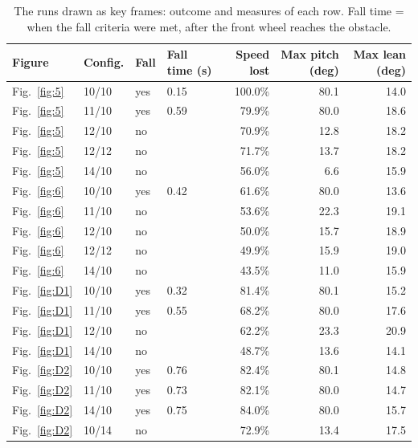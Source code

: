 \begin{table}[htbp]
\centering\small
\caption{The runs drawn as key frames: outcome and measures of each row. Fall time = when the fall criteria were met, after the front wheel reaches the obstacle.}\label{tab:Ekey}
\begin{tabular}{@{}llllrrr@{}}
\toprule
Figure & Config. & Fall & Fall time (s) & Speed lost & Max pitch (deg) & Max lean (deg) \\
\midrule
Fig.~\ref{fig:5} & 10/10 & yes & 0.15 & 100.0\% & 80.1 & 14.0 \\
Fig.~\ref{fig:5} & 11/10 & yes & 0.59 & 79.9\% & 80.0 & 18.6 \\
Fig.~\ref{fig:5} & 12/10 & no &  & 70.9\% & 12.8 & 18.2 \\
Fig.~\ref{fig:5} & 12/12 & no &  & 71.7\% & 13.7 & 18.2 \\
Fig.~\ref{fig:5} & 14/10 & no &  & 56.0\% & 6.6 & 15.9 \\
Fig.~\ref{fig:6} & 10/10 & yes & 0.42 & 61.6\% & 80.0 & 13.6 \\
Fig.~\ref{fig:6} & 11/10 & no &  & 53.6\% & 22.3 & 19.1 \\
Fig.~\ref{fig:6} & 12/10 & no &  & 50.0\% & 15.7 & 18.9 \\
Fig.~\ref{fig:6} & 12/12 & no &  & 49.9\% & 15.9 & 19.0 \\
Fig.~\ref{fig:6} & 14/10 & no &  & 43.5\% & 11.0 & 15.9 \\
Fig.~\ref{fig:D1} & 10/10 & yes & 0.32 & 81.4\% & 80.1 & 15.2 \\
Fig.~\ref{fig:D1} & 11/10 & yes & 0.55 & 68.2\% & 80.0 & 17.6 \\
Fig.~\ref{fig:D1} & 12/10 & no &  & 62.2\% & 23.3 & 20.9 \\
Fig.~\ref{fig:D1} & 14/10 & no &  & 48.7\% & 13.6 & 14.1 \\
Fig.~\ref{fig:D2} & 10/10 & yes & 0.76 & 82.4\% & 80.1 & 14.8 \\
Fig.~\ref{fig:D2} & 11/10 & yes & 0.73 & 82.1\% & 80.0 & 14.7 \\
Fig.~\ref{fig:D2} & 14/10 & yes & 0.75 & 84.0\% & 80.0 & 15.7 \\
Fig.~\ref{fig:D2} & 10/14 & no &  & 72.9\% & 13.4 & 17.5 \\
\bottomrule
\end{tabular}
\end{table}
